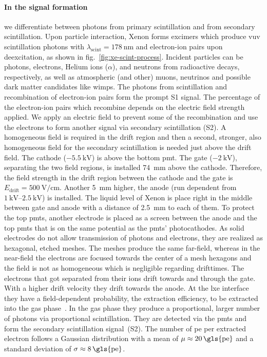 \paragraph{In the signal formation} we differentiate between photons from primary scintillation and from secondary scintillation.
Upon particle interaction, Xenon forms excimers which produce \gls{vuv} scintillation photons with $ \lambda_\mathrm{scint} = \SI{178}{\nano\meter} $ and electron-ion pairs upon deexcitation, as shown in fig.~\ref{fig:xe-scint-process}.
Incident particles can be photons, electrons, Helium ions ($ \alpha $), and neutrons from radioactive decays, respectively, as well as atmospheric (and other) muons, neutrinos and possible dark matter candidates like \glspl{wimp}.
The photons from scintillation and recombination of electron-ion pairs form the prompt S1 signal.
The percentage of the electron-ion pairs which recombine depends on the electric field strength applied.
We apply an electric field to prevent some of the recombination and use the electrons to form another signal via secondary scintillation (S2).
A homogeneous field is required in the drift region and then a second, stronger, also homogeneous field for the secondary scintillation is needed just above the drift field.
The cathode ($ \SI{-5.5}{\kilo\volt} $) is above the bottom \gls{pmt}.
The gate ($ \SI{-2}{\kilo\volt} $), separating the two field regions, is installed \SI{74}{\milli\m} above the cathode.
Therefore, the field strength in the drift region between the cathode and the gate is $ E_\mathrm{drift} = \SI{500}{\volt\per\centi\m} $.
Another \SI{5}{\milli\m} higher, the anode (run dependent from $ \SIrange{1}{2.5}{\kilo\volt} $) is installed.
The liquid level of Xenon is place right in the middle between gate and anode with a distance of \SI{2.5}{\milli\m} to each of them.
To protect the top \glspl{pmt}, another electrode is placed as a screen between the anode and the top \glspl{pmt} that is on the same potential as the \glspl{pmt}' photocathodes.
As solid electrodes do not allow transmission of photons and electrons, they are realized as hexagonal, etched meshes.
The meshes produce the same far-field, whereas in the near-field the electrons are focused towards the center of a mesh hexagons and the field is not as homogeneous which is negligible regarding drifttimes.
The electrons that got separated from their ions drift towards and through the gate.
With a higher drift velocity they drift towards the anode.
At the \gls{lxe} interface they have a field-dependent probability, the extraction efficiency, to be extracted into the gas phase~\cite{Xu19}.
In the gas phase they produce a proportional, larger number of photons via proportional scintillation.
They are detected via the \glspl{pmt} and form the secondary scintillation signal~(S2).
The number of \gls{pe} per extracted electron follows a Gaussian distribution with a mean of $ \mu \approx \SI{20}{\gls{pe}} $ and a standard deviation of $ \sigma \approx \SI{8}{\gls{pe}} $.





